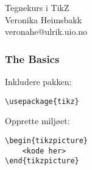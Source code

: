 \documentclass{beamer}
\begin{document}
\begin{frame}
\begin{center}
\Huge{Tegnekurs i TikZ} \\
\vspace{10pt}
\Large{Veronika Heimsbakk}\\
veronahe@ulrik.uio.no
\end{center}
\end{frame}

\begin{frame}[fragile]
\frametitle{The Basics}

Inkludere pakken:
\begin{Verbatim}[fontsize=\small]
\usepackage{tikz}
\end{Verbatim}

\vspace{20pt}

Opprette miljøet:
\begin{Verbatim}[fontsize=\small]
\begin{tikzpicture}
    <kode her>
\end{tikzpicture}
\end{Verbatim}

\end{frame}
\end{document}
